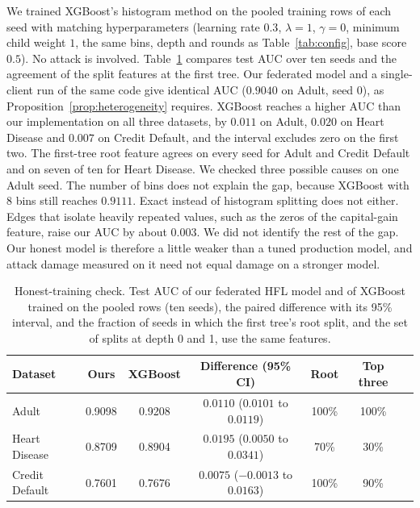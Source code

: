 \documentclass[11pt]{article}
\newcommand{\rev}[1]{#1}
\newcommand{\revfloat}[1]{#1}
\begin{document}
\rev{We trained XGBoost's histogram method on the pooled training rows of each seed with matching hyperparameters (learning rate $0.3$, $\lambda=1$, $\gamma=0$, minimum child weight $1$, the same bins, depth and rounds as Table~\ref{tab:config}, base score $0.5$). No attack is involved. Table~\ref{tab:xgbcheck} compares test AUC over ten seeds and the agreement of the split features at the first tree. Our federated model and a single-client run of the same code give identical AUC ($0.9040$ on Adult, seed 0), as Proposition~\ref{prop:heterogeneity} requires. XGBoost reaches a higher AUC than our implementation on all three datasets, by $0.011$ on Adult, $0.020$ on Heart Disease and $0.007$ on Credit Default, and the interval excludes zero on the first two. The first-tree root feature agrees on every seed for Adult and Credit Default and on seven of ten for Heart Disease. We checked three possible causes on one Adult seed. The number of bins does not explain the gap, because XGBoost with 8 bins still reaches $0.9111$. Exact instead of histogram splitting does not either. Edges that isolate heavily repeated values, such as the zeros of the capital-gain feature, raise our AUC by about $0.003$. We did not identify the rest of the gap. Our honest model is therefore a little weaker than a tuned production model, and attack damage measured on it need not equal damage on a stronger model.}

\begin{table}[htbp]
\centering
\small
\revfloat{\caption{Honest-training check. Test AUC of our federated HFL model and of XGBoost trained on the pooled rows (ten seeds), the paired difference with its 95\% interval, and the fraction of seeds in which the first tree's root split, and the set of splits at depth 0 and 1, use the same features.}\label{tab:xgbcheck}}
\begin{tabular}{lcccccc}
\toprule
\rev{Dataset} & \rev{Ours} & \rev{XGBoost} & \rev{Difference (95\% CI)} & \rev{Root} & \rev{Top three} \\
\midrule
\rev{Adult} & \rev{0.9098} & \rev{0.9208} & \rev{$0.0110$ ($0.0101$ to $0.0119$)} & \rev{100\%} & \rev{100\%} \\
\rev{Heart Disease} & \rev{0.8709} & \rev{0.8904} & \rev{$0.0195$ ($0.0050$ to $0.0341$)} & \rev{70\%} & \rev{30\%} \\
\rev{Credit Default} & \rev{0.7601} & \rev{0.7676} & \rev{$0.0075$ ($-0.0013$ to $0.0163$)} & \rev{100\%} & \rev{90\%} \\
\bottomrule
\end{tabular}
\end{table}
\end{document}
